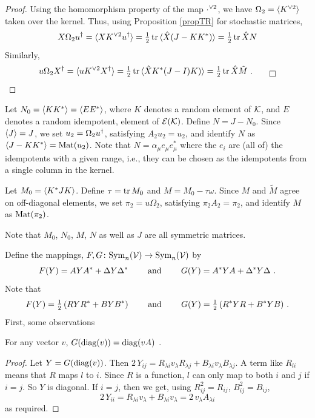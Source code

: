 \begin{proof} Using the homomorphism property of the map ${\cdot}^{\vee 2}$, we have $\Omega_2=\avg \spow{K}{2}.$ 
taken over the kernel. 
Thus, using Proposition \ref{propTR} for stochastic matrices, 
$$
  X\Omega_2\dg  u.=\avg X\spow{K}{2}{\dg  u.}.
	=\half\, \tr \avg \hat X(J-KK^*).= \half\,\tr \hat XN
$$
Similarly,
$$
  u\Omega_2\dg  X.=\avg u\spow{K}{2}{\dg  X.}.
	=\half\, \tr \avg \hat XK^*(J-I)K).
	= \half\,\tr \hat X\tilde M\ . \qed
$$ 
\end{proof}

Let $N_0=\avg KK^*.  = \avg EE^*.$, where $K$ denotes a random element of ${\mathcal K}$, and $E$ denotes a random idempotent,
element of ${\mathcal E }({\mathcal K})$. 
Define $N=J-N_0$. 
Since $\avg J.=J$, we set $u_2=\Omega_2\dg  u.$, satisfying $A_2u_2=u_2$, and identify $N$ as $\avg J-KK^*.=\Mat(u_2)$.
Note that $N=\alpha_\mu e_\mu e_\mu^*$ where the $e_i$ are (all of) the idempotents with a given range, i.e., they can be chosen as the idempotents from a single column in the kernel.

Let $M_0=\avg K^*JK.$. Define $\tau={\rm tr}\, M_0$ and  $M=M_0-\tau\omega$.  Since $M$ and $\tilde M$ agree on off-diagonal 
elements, we set $\pi_2=u\Omega_2$, satisfying $\pi_2A_2=\pi_2$, and identify $M$ as ${\rm Mat}(\pi_2)$.

Note that $M_0$, $N_0$, $M$, $N$ as well as $J$ are all symmetric matrices.

Define the mappings, $F,G\colon {\rm Sym}_n({\mathcal V})\to{\rm Sym}_n({\mathcal V})$ by
$$ 
  F(Y)={A}{Y}{A}^*+{\Delta}{Y}{\Delta}^* \qquad\hbox{ and }\qquad
	G(Y)={A}^*{Y}{A}+{\Delta}^*{Y}{\Delta}\ .
$$
Note that
$$ 
  F(Y)=\tfrac{1}{2}\,({R}{Y}{R}^*+{B}{Y}{B}^*) \qquad\hbox{ and }\qquad
	G(Y)=\tfrac{1}{2}\,({R}^*{Y}{R}+{B}^*{Y}{B})\ .
$$
First, some observations

\begin{proposition}   	\label{prop:7.8}   %
For any vector $v$, \rm $G({\rm diag}({v})) = {\rm diag}({vA})$ .
\end{proposition}

\begin{proof} Let $Y=G({\rm diag}({v}))$. 
Then $2\,Y_{ij}=R_{\lambda i}v_{\lambda}R_{\lambda j}+B_{\lambda i}v_{\lambda}B_{\lambda j}$.
A term like $R_{li}$ means that $R$ maps $l$ to $i$. 
Since $R$ is a function, $l$ can only map to both $i$ and $j$ if $i=j$.
So $Y$ is diagonal. If $i=j$, then we get, using $R_{ij}^2=R_{ij}$, $B_{ij}^2=B_{ij}$,
$$
  2\,Y_{ii}=R_{\lambda i}v_{\lambda}+B_{\lambda i}v_{\lambda}
	=2\,v_\lambda A_{\lambda i}
$$
as required.
\end{proof}

